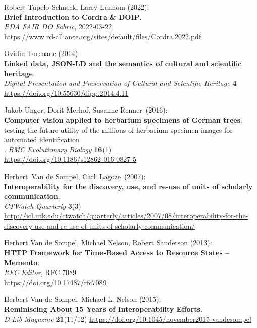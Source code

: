 \begin{thebibliography}{9}
Robert Tupelo-Schneck, Larry Lannom (2022):\\
\textbf{Brief Introduction to Cordra \& DOIP}.\\
\emph{RDA FAIR DO Fabric}, 2022-03-22\\
\url{https://www.rd-alliance.org/sites/default/files/Cordra.2022.pdf}

Ovidiu Turcoane (2014): \\
\textbf{Linked data, {JSON-LD} and the semantics of cultural and scientific heritage}. \\
\emph{Digital Presentation and Preservation of Cultural and Scientific Heritage} \textbf{4} \\
\url{https://doi.org/10.55630/dipp.2014.4.11}

Jakob Unger, Dorit Merhof, Susanne Renner~(2016):\\
\textbf{Computer vision applied to
herbarium specimens of German trees}: testing the future utility of the
millions of herbarium specimen images for automated identification\\. 
\emph{BMC Evolutionary Biology} \textbf{16}(1)\\
\url{https://doi.org/10.1186/s12862-016-0827-5}

Herbert~Van de Sompel, Carl~Lagoze~(2007):\\
\textbf{Interoperability for the discovery, use, and re-use of units of
scholarly communication}.\\
\emph{CTWatch Quarterly} \textbf{3}(3)\\
\url{http://icl.utk.edu/ctwatch/quarterly/articles/2007/08/interoperability-for-the-discovery-use-and-re-use-of-units-of-scholarly-communication/}

Herbert Van de Sompel, Michael Nelson, Robert Sanderson (2013):\\
\textbf{{HTTP Framework} for {Time-Based Access} to {Resource States} --
{Memento}}.\\
\emph{RFC Editor}, RFC 7089\\
\url{https://doi.org/10.17487/rfc7089}

Herbert Van de Sompel, Michael L. Nelson (2015):\\
\textbf{Reminiscing About 15 Years of Interoperability Efforts}.\\
\emph{D-Lib Magazine} \textbf{21}(11/12)
\url{https://doi.org/10.1045/november2015-vandesompel}


\end{thebibliography}
